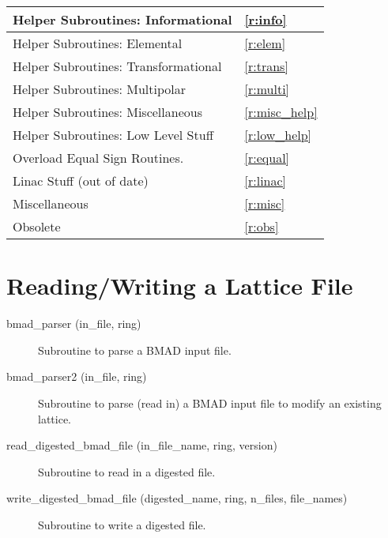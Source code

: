 \begin{center}
\begin{tabular}{|l|l|}
 	Helper Subroutines: Informational       & \ref{r:info}      \\ \hline
 	Helper Subroutines: Elemental           & \ref{r:elem}      \\ \hline
 	Helper Subroutines: Transformational    & \ref{r:trans}     \\ \hline
 	Helper Subroutines: Multipolar          & \ref{r:multi}     \\ \hline
 	Helper Subroutines: Miscellaneous       & \ref{r:misc_help} \\ \hline
 	Helper Subroutines: Low Level Stuff     & \ref{r:low_help}  \\ \hline
 	Overload Equal Sign Routines.           & \ref{r:equal}     \\ \hline
 	Linac Stuff (out of date)               & \ref{r:linac}     \\ \hline
 	Miscellaneous                           & \ref{r:misc}      \\ \hline
 	Obsolete                                & \ref{r:obs}       \\ \hline
\end{tabular}
\end{center}
\toffset

\section{Reading/Writing a Lattice File} 
\label{r:read}

\begin{description}

\item[bmad\_parser (in\_file, ring)] \Newline
Subroutine to parse a BMAD input file. 

\item[bmad\_parser2 (in\_file, ring)] \Newline
Subroutine to parse (read in) a BMAD input file to modify an existing lattice. 

\item[read\_digested\_bmad\_file (in\_file\_name, ring, version)] \Newline
Subroutine to read in a digested file. 

\item[write\_digested\_bmad\_file (digested\_name, ring, n\_files, file\_names)] \Newline
Subroutine to write a digested file. 

\end{description}

